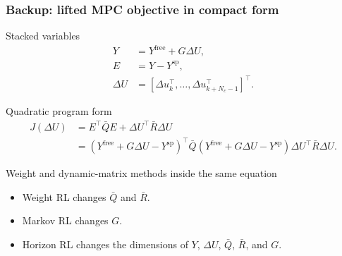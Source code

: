 \documentclass[aspectratio=169]{beamer}
\begin{document}
\begin{frame}
\frametitle{\large \textbf{Backup: lifted MPC objective in compact form}}
\scriptsize

\begin{block}{Stacked variables}
\begin{align*}
Y &= Y^{\mathrm{free}}+G\Delta U,\\
E &= Y-Y^{\mathrm{sp}},\\
\Delta U &= [\Delta u_k^\top,\ldots,\Delta u_{k+N_c-1}^\top]^\top.
\end{align*}
\end{block}

\begin{block}{Quadratic program form}
\begin{align*}
J(\Delta U)
&=E^\top\bar{Q}E+\Delta U^\top\bar{R}\Delta U\\
&=(Y^{\mathrm{free}}+G\Delta U-Y^{\mathrm{sp}})^\top
\bar{Q}
(Y^{\mathrm{free}}+G\Delta U-Y^{\mathrm{sp}})
\Delta U^\top\bar{R}\Delta U.
\end{align*}
\end{block}

\begin{block}{Weight and dynamic-matrix methods inside the same equation}
\begin{itemize}\justifying
  \setlength\itemsep{0.35ex}
  \item Weight RL changes \(\bar{Q}\) and \(\bar{R}\).
  \item Markov RL changes \(G\).
  \item Horizon RL changes the dimensions of \(Y\), \(\Delta U\), \(\bar{Q}\), \(\bar{R}\), and \(G\).
\end{itemize}
\end{block}
\end{frame}
\end{document}
